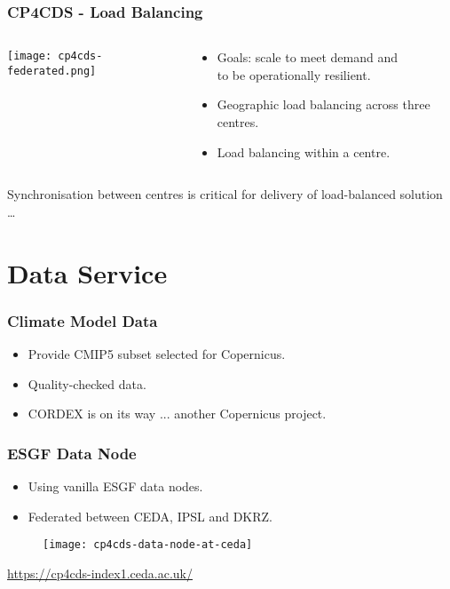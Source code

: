 \documentclass{beamer}
\begin{document}
\begin{frame}
\frametitle<presentation>{CP4CDS - Load Balancing}
  \begin{columns}[c]
    \begin{column}{.5\textwidth}
      \centering
      \texttt{[image: cp4cds-federated.png]}
    \end{column}
    \begin{column}{.5\textwidth}
      \begin{itemize}
        \item Goals: scale to meet demand and\\
            to be operationally resilient.
        \item Geographic load balancing across three centres.
        \item Load balancing within a centre.
      \end{itemize}
    \end{column}
  \end{columns}
  \vfill
  Synchronisation between centres is critical for delivery of load-balanced solution \ldots

\end{frame}

\section{Data Service}

\begin{frame}
\frametitle<presentation>{Climate Model Data}

  \begin{itemize}
    \item Provide CMIP5 subset selected for Copernicus.
    \item Quality-checked data.
    \item CORDEX is on its way ... another Copernicus project.
  \end{itemize}

\end{frame}

\begin{frame}
\frametitle<presentation>{ESGF Data Node}

  \begin{itemize}
    \item Using vanilla ESGF data nodes.
    \item Federated between CEDA, IPSL and DKRZ.
  \end{itemize}

  \begin{figure}[ht]
    \centering
    \texttt{[image: cp4cds-data-node-at-ceda]}
  \end{figure}

  \centering
  \footnotesize{\url{https://cp4cds-index1.ceda.ac.uk/}}

\end{frame}
\end{document}
